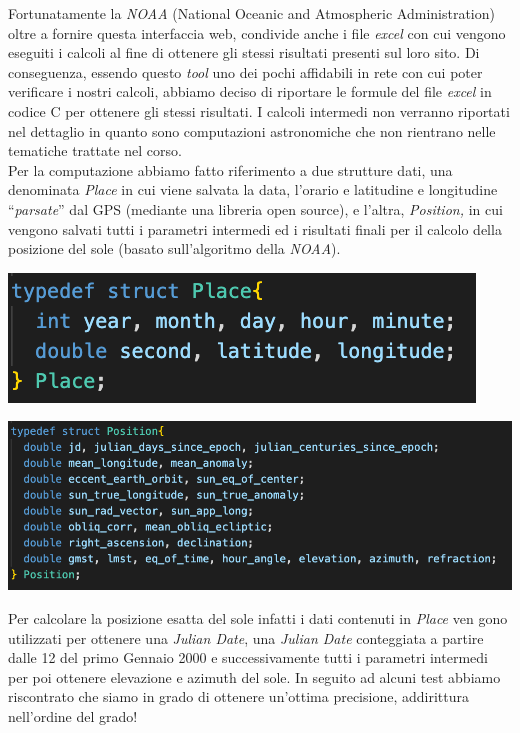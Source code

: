 \noindent Fortunatamente la \emph{NOAA} (National Oceanic and Atmospheric
Administration) oltre a fornire questa interfaccia web, condivide anche
i file \emph{excel} con cui vengono eseguiti i calcoli al fine di
ottenere gli stessi risultati presenti sul loro sito. Di conseguenza,
essendo questo \emph{tool} uno dei pochi affidabili in rete con cui
poter verificare i nostri calcoli, abbiamo deciso di riportare le
formule del file \emph{excel} in codice C per ottenere gli stessi
risultati. I calcoli intermedi non verranno riportati nel dettaglio in
quanto sono computazioni astronomiche che non rientrano nelle tematiche
trattate nel corso.\\
Per la computazione abbiamo fatto riferimento a due strutture dati, una
denominata \emph{Place} in cui viene salvata la data, l'orario e
latitudine e longitudine ``\emph{parsate}'' dal GPS (mediante una
libreria open source), e l'altra, \emph{Position,} in cui vengono
salvati tutti i parametri intermedi ed i risultati finali per il calcolo
della posizione del sole (basato sull'algoritmo della \emph{NOAA}).

\begin{center}
\includegraphics[scale=1]{figures/image25.png}
\captionsetup{type=figure}
\end{center}

\begin{center}
\includegraphics[scale=0.8]{figures/image33.png}
\captionsetup{type=figure}
\end{center}

\noindent Per calcolare la posizione esatta del sole infatti i dati contenuti in
\emph{Place} ven gono utilizzati per ottenere una \emph{Julian Date},
una \emph{Julian Date} conteggiata a partire dalle 12 del primo Gennaio
2000 e successivamente tutti i parametri intermedi per poi ottenere
elevazione e azimuth del sole. In seguito ad alcuni test abbiamo
riscontrato che siamo in grado di ottenere un'ottima precisione,
addirittura nell'ordine del grado!


